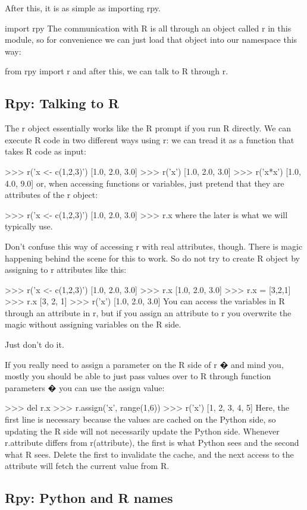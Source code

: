 After this, it is as simple as importing rpy.

import rpy
The communication with R is all through an object called r in this module, so for convenience we can just load that object into our namespace this way:

from rpy import r
and after this, we can talk to R through r.


\subsection{Rpy: Talking to R}

The r object essentially works like the R prompt if you run R directly. We can execute R code in two different ways using r: we can tread it as a function that takes R code as input:

>>> r('x <- c(1,2,3)')
[1.0, 2.0, 3.0]
>>> r('x')
[1.0, 2.0, 3.0]
>>> r('x*x')
[1.0, 4.0, 9.0]
or, when accessing functions or variables, just pretend that they are attributes of the r object:

>>> r('x <- c(1,2,3)')
[1.0, 2.0, 3.0]
>>> r.x
where the later is what we will typically use.

Don't confuse this way of accessing r with real attributes, though. There is magic happening behind the scene for this to work. So do not try to create R object by assigning to r attributes like this:

>>> r('x <- c(1,2,3)')
[1.0, 2.0, 3.0]
>>> r.x
[1.0, 2.0, 3.0]
>>> r.x = [3,2,1]
>>> r.x
[3, 2, 1]
>>> r('x')
[1.0, 2.0, 3.0]
You can access the variables in R through an attribute in r, but if you assign an attribute to r you overwrite the magic without assigning variables on the R side.

Just don't do it.

If you really need to assign a parameter on the R side of r � and mind you, mostly you should be able to just pass values over to R through function parameters � you can use the assign value:

>>> del r.x
>>> r.assign('x', range(1,6))
>>> r('x')
[1, 2, 3, 4, 5]
Here, the first line is necessary because the values are cached on the Python side, so updating the R side will not necessarily update the Python side. Whenever r.attribute differs from r(attribute), the first is what Python sees and the second what R sees. Delete the first to invalidate the cache, and the next access to the attribute will fetch the current value from R.


\subsection{Rpy: Python and R names}

